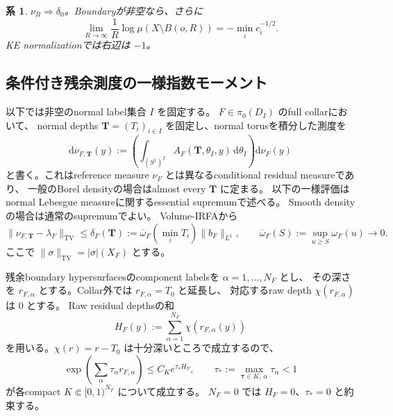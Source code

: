 \documentclass[11pt,a4paper]{ltjsarticle}
\newcommand{\dd}{\mathrm d}
\theoremstyle{plain}
\newtheorem{corollary}[corollary]{系}
\theoremstyle{definition}
\theoremstyle{remark}
\begin{document}
\begin{corollary}
$\nu_R\Rightarrow\delta_0$。Boundaryが非空なら、さらに
\[
 \lim_{R\to\infty}\frac1R\log\mu(X\setminus B(o,R))
 =-\min_i c_i^{-1/2}.
\]
KE normalizationでは右辺は $-1$。
\end{corollary}

\subsection{条件付き残余測度の一様指数モーメント}
以下では非空のnormal label集合 $I$ を固定する。
$F\in\pi_0(D_I)$ のfull collarにおいて、
normal depths $\bm T=(T_i)_{i\in I}$ を固定し、normal torusを積分した測度を
\[
 \dd\nu_{F,\bm T}(y)
 :=\left(\int_{(S^1)^I}
       A_F(\bm T,\theta_I,y)\,\dd\theta_I\right)\dd\nu_F(y)
\]
と書く。これはreference measure $\nu_F$ とは異なるconditional residual measureであり、
一般のBorel densityの場合はalmost every $\bm T$ に定まる。
以下の一様評価はnormal Lebesgue measureに関するessential supremumで述べる。
Smooth densityの場合は通常のsupremumでよい。
Volume-IRFAから
\begin{equation}
\label{eq:Mellin-unweighted-TV}
 \|\nu_{F,\bm T}-\lambda_F\|_{\mathrm{TV}}
 \le \delta_F(\bm T)
 :=\overline\omega_F(\min_iT_i)\|b_F\|_{L^1},
 \qquad
 \overline\omega_F(S):=\sup_{u\ge S}\omega_F(u)\longrightarrow0.
\end{equation}
ここで $\|\sigma\|_{\mathrm{TV}}=|\sigma|(X_F)$ とする。

残余boundary hypersurfacesのcomponent labelsを $\alpha=1,\ldots,N_F$ とし、
その深さを $r_{F,\alpha}$ とする。Collar外では $r_{F,\alpha}=T_0$ と延長し、
対応するraw depth $\chi(r_{F,\alpha})$ は $0$ とする。
Raw residual depthsの和
\[
 H_F(y):=\sum_{\alpha=1}^{N_F}\chi(r_{F,\alpha}(y))
\]
を用いる。$\chi(r)=r-T_0$ は十分深いところで成立するので、
\begin{equation}
\label{eq:Mellin-residual-weight}
 \exp\!\left(\sum_\alpha\tau_\alpha r_{F,\alpha}\right)
 \le C_K e^{\tau_*H_F},\qquad
 \tau_*:=\max_{\bm\tau\in K,\,\alpha}\tau_\alpha<1
\end{equation}
が各compact $K\Subset[0,1)^{N_F}$ について成立する。
$N_F=0$ では $H_F=0$、$\tau_*=0$ と約束する。
\end{document}

